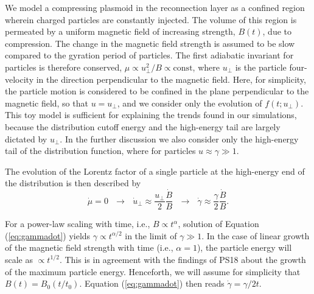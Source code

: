 We model a compressing plasmoid in the reconnection layer as a confined region wherein charged particles are constantly injected. The volume of this region is permeated by a uniform magnetic field of increasing strength, $B(t)$, due to compression. The change in the magnetic field strength is assumed to be slow compared to the gyration period of particles. The first adiabatic invariant for particles is therefore conserved, $\mu \propto u_{\perp}^2 / B \propto \mathrm{const}$, where $u_{\perp}$ is the particle four-velocity in the direction perpendicular to the magnetic field. Here, for simplicity, the particle motion is considered to be confined in the plane perpendicular to the magnetic field, so that $u = u_{\perp}$, and we consider only the evolution of $f(t;u_\perp)$. This toy model is sufficient for explaining the trends found in our simulations, because the distribution cutoff energy and the high-energy tail are largely dictated by $u_{\perp}$. In the further discussion we also consider only the high-energy tail of the distribution function, where for particles $u\approx \gamma \gg 1$.

The evolution of the Lorentz factor of a single particle at the high-energy end of the distribution is then described by
\begin{equation}
    \label{eq:gammadot}
    \dot{\mu}=0~~~\rightarrow~~~\dot{u}_\perp\approx\frac{u_\perp}{2}\frac{\dot{B}}{B}~~~\rightarrow~~~\dot{\gamma}\approx\frac{\gamma}{2}\frac{\dot{B}}{B}.
\end{equation}

For a power-law scaling with time, i.e., $B\propto t^{\alpha}$, solution of Equation (\ref{eq:gammadot}) yields $\gamma\propto t^{\alpha/2}$ in the limit of $\gamma\gg 1$. In the case of linear growth of the magnetic field strength with time (i.e., $\alpha=1$), the particle energy will scale as $\propto t^{1/2}$. This is in agreement with the findings of PS18 about the growth of the maximum particle energy. Henceforth, we will assume for simplicity that $B(t)=B_0 \left(t/t_0\right)$. Equation (\ref{eq:gammadot}) then reads $\dot{\gamma}=\gamma/2t$.

